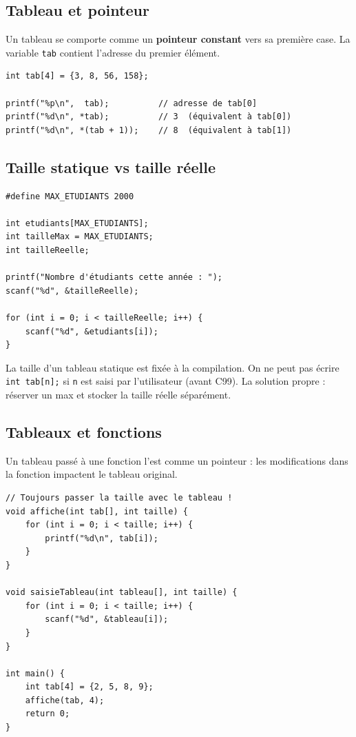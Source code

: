 \documentclass[12pt,a4paper]{article}
\begin{document}
\subsection{Tableau et pointeur}

Un tableau se comporte comme un \textbf{pointeur constant} vers sa première case. La variable \texttt{tab} contient l'adresse du premier élément.

\begin{lstlisting}[caption={Équivalence tableau / pointeur}]
int tab[4] = {3, 8, 56, 158};

printf("%p\n",  tab);          // adresse de tab[0]
printf("%d\n", *tab);          // 3  (équivalent à tab[0])
printf("%d\n", *(tab + 1));    // 8  (équivalent à tab[1])
\end{lstlisting}

\subsection{Taille statique vs taille réelle}

\begin{lstlisting}[caption={Gérer taille max et taille réelle}]
#define MAX_ETUDIANTS 2000

int etudiants[MAX_ETUDIANTS];
int tailleMax = MAX_ETUDIANTS;
int tailleReelle;

printf("Nombre d'étudiants cette année : ");
scanf("%d", &tailleReelle);

for (int i = 0; i < tailleReelle; i++) {
    scanf("%d", &etudiants[i]);
}
\end{lstlisting}

\begin{important}
La taille d'un tableau statique est fixée à la compilation. On ne peut pas écrire \texttt{int tab[n];} si \texttt{n} est saisi par l'utilisateur (avant C99). La solution propre : réserver un max et stocker la taille réelle séparément.
\end{important}

\subsection{Tableaux et fonctions}

Un tableau passé à une fonction l'est comme un pointeur : les modifications dans la fonction impactent le tableau original.

\begin{lstlisting}[caption={Passage de tableau en paramètre}]
// Toujours passer la taille avec le tableau !
void affiche(int tab[], int taille) {
    for (int i = 0; i < taille; i++) {
        printf("%d\n", tab[i]);
    }
}

void saisieTableau(int tableau[], int taille) {
    for (int i = 0; i < taille; i++) {
        scanf("%d", &tableau[i]);
    }
}

int main() {
    int tab[4] = {2, 5, 8, 9};
    affiche(tab, 4);
    return 0;
}
\end{lstlisting}
\end{document}
